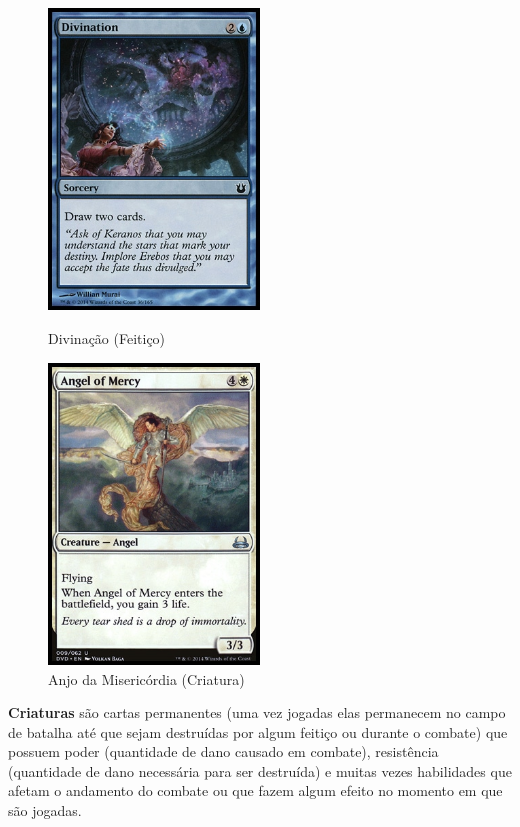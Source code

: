 \documentclass{book}
\begin{document}
\begin{figure}[!h]
    \centering
    \begin{minipage}{0.45\textwidth}
        \centering
        \includegraphics[width=0.5\textwidth]{picstcc/divination.jpg}
        \caption{Divinação (Feitiço)}
        \label{divination}
    \end{minipage}\hfill
    \begin{minipage}{0.45\textwidth}
        \centering
        \includegraphics[width=0.5\textwidth]{picstcc/angelOfMercy.jpg}
        \caption{Anjo da Misericórdia (Criatura)}
        \label{anjo}
    \end{minipage}
\end{figure}

\textbf{Criaturas} são cartas permanentes (uma vez jogadas elas
permanecem no campo de batalha até que sejam destruídas por algum
feitiço ou durante o combate) que possuem poder (quantidade de dano
causado em combate), resistência (quantidade de dano necessária para ser
destruída) e muitas vezes habilidades que afetam o andamento do combate
ou que fazem algum efeito no momento em que são jogadas.
\end{document}
